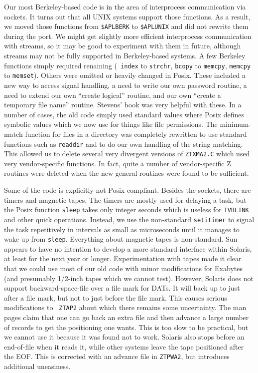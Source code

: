 Our most Berkeley-based code is in the area of interprocess communication
via sockets.  It turns out that all UNIX systems support those
functions.  As a result, we moved those functions from {\tt \$APLBERK}
to {\tt \$APLUNIX} and did not rewrite them during the port.  We might
get slightly more efficient interprocess communication with streams,
so it may be good to experiment with them in future, although streams
may not be fully supported in Berkeley-based systems.  A few Berkeley
functions simply required renaming (\eg\ {\tt index} to {\tt strchr},
{\tt bcopy} to {\tt memcpy}, {\tt memcpy} to {\tt memset}).  Others
were omitted or heavily changed in Posix.  These included a new way to
access signal handling, a need to write our own password routine, a
need to extend our own ``create logical'' routine, and our own
``create a temporary file name'' routine.  Stevens' book was very
helpful with these.  In a number of cases, the old code simply used
standard values where Posix defines symbolic values which we now use
for things like file permissions.  The minimum-match function for
files in a directory was completely rewritten to use standard
functions such as {\tt readdir} and to do our own handling of the
string matching.  This allowed us to delete several very divergent
versions of {\tt ZTXMA2.C} which used very vendor-specific functions.
In fact, quite a number of vendor-specific Z routines were deleted
when the new general routines were found to be sufficient.

Some of the code is explicitly not Posix compliant.  Besides the
sockets, there are timers and magnetic tapes.  The timers are mostly
used for delaying a task, but the Posix function {\tt sleep} takes
only integer seconds which is useless for {\tt TVBLINK} and other
quick operations.  Instead, we use the non-standard {\tt setitimer} to
signal the task repetitively in intervals as small as microseconds
until it manages to wake up from {\tt sleep}.  Everything about
magnetic tapes is non-standard.  Sun appears to have no intention to
develop a more standard interface within Solaris, at least for the
next year or longer.  Experimentation with tapes made it clear that we
could use most of our old code with minor modifications for Exabytes
(and presumably 1/2-inch tapes which we cannot test).  However,
Solaris does not support backward-space-file over a file mark for
DATs.  It will back up to just after a file mark, but not to just
before the file mark.  This causes serious modifications to {\tt
ZTAP2} about which there remains some uncertainty.  The man pages
claim that one can go back an extra file and then advance a large
number of records to get the positioning one wants.  This is too slow
to be practical, but we cannot use it because it was found not to
work.  Solaris also stops before an end-of-file when it reads it,
while other systems leave the tape positioned after the \hbox{{EOF}}.
This is corrected with an advance file in {\tt ZTPWA2}, but introduces
additional uneasiness.

